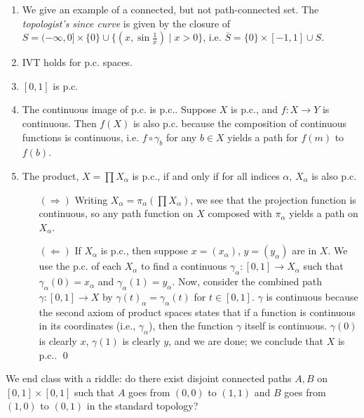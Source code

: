 \begin{enumerate}[label=(\alph*)]
    \item We give an example of a connected, but not path-connected set. The \textit{topologist's since curve} is given by the closure of $S = (-\infty, 0] \times \{0\} \cup \{(x, \sin \frac{1}{x}) \mid x > 0\}$, i.e. $\overline{S} = \{0\} \times [-1, 1] \cup S$.
    \item IVT holds for p.c. spaces.
    \item $[0, 1]$ is p.c.
    \item The continuous image of p.c. is p.c.. Suppose $X$ is p.c., and $f : X \to Y$ is continuous. Then $f(X)$ is also p.c. because the composition of continuous functions is continuous, i.e. $f \circ \gamma_b$ for any $b \in X$ yields a path for $f(m)$ to $f(b)$.
    \item The product, $X = \prod X_\alpha$ is p.c., if and only if for all indices $\alpha$, $X_\alpha$ is also p.c.
    \begin{itemize}
        \item[$(\Rightarrow)$] Writing $X_\alpha = \pi_\alpha (\prod X_\alpha)$, we see that the projection function is continuous, so any path function on $X$ composed with $\pi_\alpha$ yields a path on $X_\alpha$.
        \item[$(\Leftarrow)$] If $X_\alpha$ is p.c., then suppose $x = (x_\alpha)$, $y = (y_\alpha)$ are in $X$. We use the p.c. of each $X_\alpha$ to find a continuous $\gamma_\alpha : [0, 1] \to X_\alpha$ such that $\gamma_\alpha(0) = x_\alpha$ and $\gamma_\alpha(1) = y_\alpha$. Now, consider the combined path $\gamma : [0, 1] \to X$ by $\gamma(t)_\alpha = \gamma_\alpha(t)$ for $t \in [0, 1]$. $\gamma$ is continuous because the second axiom of product spaces states that if a function is continuous in its coordinates (i.e., $\gamma_\alpha$), then the function $\gamma$ itself is continuous. $\gamma(0)$ is clearly $x$, $\gamma(1)$ is clearly $y$, and we are done; we conclude that $X$ is p.c.. \qed
    \end{itemize}
\end{enumerate}

\noindent We end class with a riddle: do there exist disjoint connected paths $A, B$ on $[0, 1] \times [0, 1]$ such that $A$ goes from $(0, 0)$ to $(1, 1)$ and $B$ goes from $(1, 0)$ to $(0, 1)$ in the standard topology?